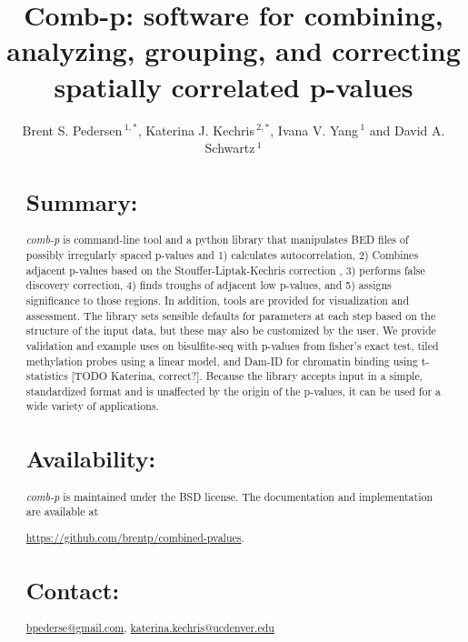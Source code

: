 \documentclass{bioinfo}
\begin{document}

\title[comb-p]{Comb-p: software for combining, analyzing, grouping, and correcting spatially correlated p-values}
\author[Pedersen \textit{et~al}]{Brent S. Pedersen\,$^{1,*}$,
Katerina J.  Kechris\,$^{2,*}$,
    Ivana V. Yang\,$^{1}$ and David A. Schwartz\,$^1$}
\address{$^{1}$Department of Medicine, University of Colorado, Denver, Anschutz Medical Campus, Aurora CO 80045, USA\\
$^{2}$Department of Statistics, University of Colorado, Denver, Anschutz Medical Campus, Aurora CO 80045, USA\\
}
\maketitle
\begin{abstract}

\section{Summary:}
\textit{comb-p} is command-line tool and a python library that
manipulates BED files of possibly irregularly spaced p-values and
1) calculates autocorrelation,
2) Combines adjacent p-values based on the Stouffer-Liptak-Kechris correction \citep{Kechris2010},
3) performs false discovery correction,
4) finds troughs of adjacent low p-values, and
5) assigns significance to those regions.
In addition, tools are provided for visualization and
assessment. The library sets sensible defaults for parameters at each
step based on the structure of the input data, but these may also be customized
by the user. We provide validation and example uses on bisulfite-seq with p-values
from fisher's exact test,
tiled methylation probes using a linear model, and Dam-ID for chromatin binding
using t-statistics [TODO Katerina, correct?]. Because the library
accepts input in a simple, standardized format and is unaffected by the origin
of the p-values, it can be used for a wide variety of applications.

\section{Availability:}
\textit{comb-p} is maintained under the BSD license. The documentation and
implementation are available at

\href{https://github.com/brentp/combined-pvalues}{https://github.com/brentp/combined-pvalues}.
\section{Contact:} \href{bpederse@gmail.com}{bpederse@gmail.com},
\href{katerina.kechris@ucdenver.edu}{katerina.kechris@ucdenver.edu}

\end{abstract}
\end{document}
